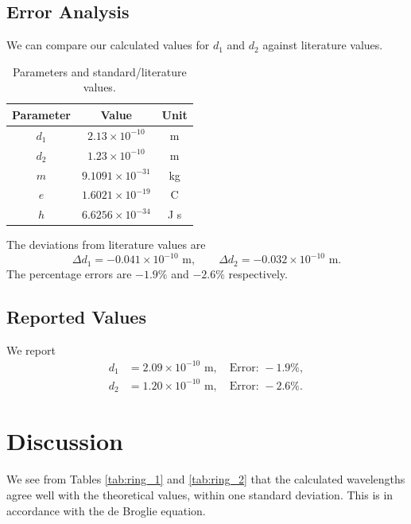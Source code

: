 \documentclass[11pt]{article}
\begin{document}
        \subsection{Error Analysis}
        We can compare our calculated values for $d_1$ and $d_2$ against literature values.
        \begin{table}[H]
                \centering
                \caption{Parameters and standard/literature values.}
                \label{tab:parameters}
                \begin{tabular}{c|c|c} \hline
                Parameter       & Value                         & Unit  \\\hline\hline
                $d_1$           & $2.13 \times 10^{-10}$        & m     \\
                $d_2$           & $1.23 \times 10^{-10}$        & m     \\
                $m$             & $9.1091 \times 10^{-31}$      & kg    \\
                $e$             & $1.6021 \times 10^{-19}$      & C     \\
                $h$             & $6.6256 \times 10^{-34}$      & J s   \\\hline
                \end{tabular}
        \end{table}
        The deviations from literature values are
        \[
                \Delta d_1 = -0.041 \times 10^{-10}\text{ m}, \qquad \Delta d_2 = -0.032 \times 10^{-10}\text{ m}.
        \]
        The percentage errors are $-1.9\%$ and $-2.6\%$ respectively.

        \subsection{Reported Values}
        We report
        \begin{align*}
                d_1 &= 2.09 \times 10^{-10}\text{ m}, \quad \text{Error: } -1.9\%, \\
                d_2 &= 1.20 \times 10^{-10}\text{ m}, \quad \text{Error: } -2.6\%.
        \end{align*}

        \section{Discussion}
        We see from Tables \ref{tab:ring_1} and \ref{tab:ring_2} that the calculated wavelengths agree well with the theoretical values,
        within one standard deviation. This is in accordance with the de Broglie equation.
\end{document}
